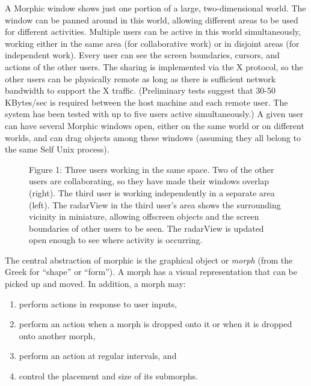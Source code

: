\documentclass[letterpaper,10pt,english]{sphinxmanual}
\begin{document}
A Morphic window shows just one portion of a large, two-dimensional world. The window can be panned around in this world, allowing different areas to be used for different activities. Multiple users can be active in this world simultaneously, working either in the same area (for collaborative work) or in disjoint areas (for independent work). Every user can see the screen boundaries, cursors, and actions of the other users. The sharing is implemented via the X protocol, so the other users can be physically remote as long as there is sufficient network bandwidth to support the X traffic. (Preliminary tests suggest that 30-50 KBytes/sec is required between the host machine and each remote user. The system has been tested with up to five users active simultaneously.) A given user can have several Morphic windows open, either on the same world or on different worlds, and can drag objects among these windows (assuming they all belong to the same Self Unix process).
\begin{figure}[htbp]\begin{flushleft}
\capstart

\caption{Figure 1: Three users working in the same space. Two of the other users are collaborating, so they have made their windows overlap (right). The third user is working independently in a separate area (left). The radarView in the third user's area shows the surrounding vicinity in miniature, allowing offscreen objects and the screen boundaries of other users to be seen. The radarView is updated open enough to see where activity is occurring.}\end{flushleft}\end{figure}

The central abstraction of morphic is the graphical object or \emph{morph} (from the Greek for ``shape'' or ``form''). A morph has a visual representation that can be picked up and moved. In addition, a morph may:
\begin{enumerate}
\item {} 
perform actions in response to user inputs,

\item {} 
perform an action when a morph is dropped onto it or when it is dropped onto another morph,

\item {} 
perform an action at regular intervals, and

\item {} 
control the placement and size of its submorphs.

\end{enumerate}
\end{document}
